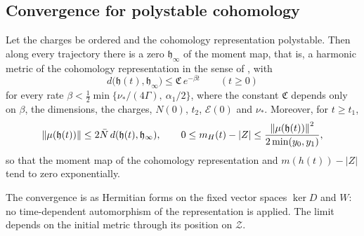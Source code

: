 \subsection{Convergence for polystable cohomology}

\begin{theorem}\label{thm:convergence}
Let the charges be ordered and the cohomology representation polystable.
Then along every trajectory there is a zero $\mathfrak h_\infty$ of the moment map,
that is, a harmonic metric of the cohomology representation in the sense of
\cite{hkkp26}, with
\[
 d\bigl(\mathfrak h(t),\mathfrak h_\infty\bigr)\leq\mathfrak C\,e^{-\beta t}\qquad(t\geq0)
\]
for every rate $\beta<\frac12\min\{\nu_*/(4\Gamma),\ \alpha_1/2\}$, where the
constant $\mathfrak C$ depends only on $\beta$, the dimensions, the charges, $N(0)$, $t_2$,
$\mathcal E(0)$ and $\nu_*$. Moreover, for $t\geq t_1$,
\[
 \left\lVert\mu(\mathfrak h(t))\right\rVert\leq2\bar N\,d(\mathfrak h(t),\mathfrak h_\infty),\qquad
 0\leq m_H(t)-|Z|\leq\frac{\left\lVert\mu(\mathfrak h(t))\right\rVert^2}{2\min(y_0,y_1)},
\]
so that the moment map of the cohomology representation and $m(h(t))-|Z|$
tend to zero exponentially.
\end{theorem}

The convergence is as Hermitian forms on the fixed vector spaces $\ker D$ and
$W$: no time-dependent automorphism of the representation is applied. The
limit depends on the initial metric through its position on $\mathcal Z$.

